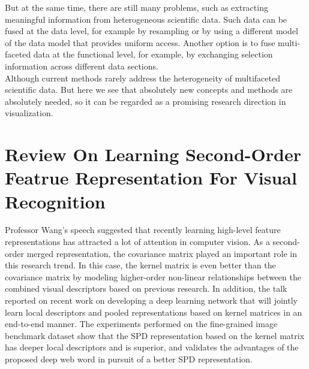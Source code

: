 \documentclass[12pt, a4paper]{article}
\begin{document}
But at the same time, there are still many problems, such as extracting meaningful information from heterogeneous scientific data. Such data can be fused at the data level, for example by resampling or by using a different model of the data model that provides uniform access. Another option is to fuse multi-faceted data at the functional level, for example, by exchanging selection information across different data sections.\\
Although current methods rarely address the heterogeneity of multifaceted scientific data. But here we see that absolutely new concepts and methods are absolutely needed, so it can be regarded as a promising research direction in visualization.\\

\section*{Review On Learning Second-Order Featrue Representation For Visual Recognition}
Professor Wang's speech suggested that recently learning high-level feature representations has attracted a lot of attention in computer vision. As a second-order merged representation, the covariance matrix played an important role in this research trend. In this case, the kernel matrix is even better than the covariance matrix by modeling higher-order non-linear relationships between the combined visual descriptors based on previous research. In addition, the talk reported on recent work on developing a deep learning network that will jointly learn local descriptors and pooled representations based on kernel matrices in an end-to-end manner. The experiments performed on the fine-grained image benchmark dataset show that the SPD representation based on the kernel matrix has deeper local descriptors and is superior, and validates the advantages of the proposed deep web word in pursuit of a better SPD representation.\\
\end{document}
